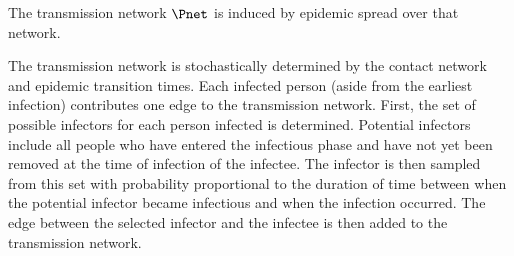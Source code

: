 The transmission network $\Pnet$ is induced by epidemic spread over that network. 

The transmission network is stochastically determined by the contact network and epidemic transition times. Each infected person (aside from the earliest infection) contributes one edge to the transmission network. First, the set of possible infectors for each person infected is determined. Potential infectors include all people who have entered the infectious phase and have not yet been removed at the time of infection of the infectee. The infector is then sampled from this set with probability proportional to the duration of time between when the potential infector became infectious and when the infection occurred. The edge between the selected infector and the infectee is then added to the transmission network.
